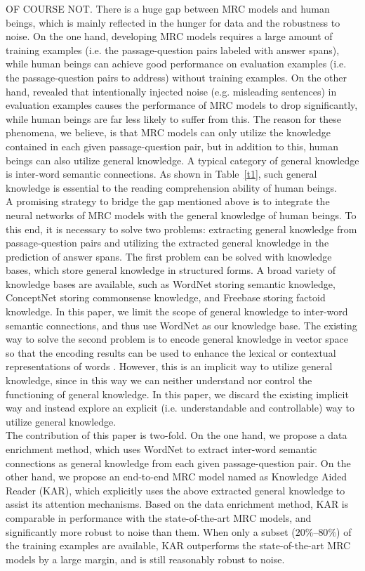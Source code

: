 \documentclass[11pt,a4paper]{article}
\begin{document}
OF COURSE NOT. There is a huge gap between MRC models and human beings, which is mainly reflected in the hunger for data and the robustness to noise. On the one hand, developing MRC models requires a large amount of training examples (i.e. the passage-question pairs labeled with answer spans), while human beings can achieve good performance on evaluation examples (i.e. the passage-question pairs to address) without training examples. On the other hand, \citet{jiarobin:2017} revealed that intentionally injected noise (e.g. misleading sentences) in evaluation examples causes the performance of MRC models to drop significantly, while human beings are far less likely to suffer from this. The reason for these phenomena, we believe, is that MRC models can only utilize the knowledge contained in each given passage-question pair, but in addition to this, human beings can also utilize general knowledge. A typical category of general knowledge is inter-word semantic connections. As shown in Table~\ref{t1}, such general knowledge is essential to the reading comprehension ability of human beings. \\
A promising strategy to bridge the gap mentioned above is to integrate the neural networks of MRC models with the general knowledge of human beings. To this end, it is necessary to solve two problems: extracting general knowledge from passage-question pairs and utilizing the extracted general knowledge in the prediction of answer spans. The first problem can be solved with knowledge bases, which store general knowledge in structured forms. A broad variety of knowledge bases are available, such as WordNet \cite{fellbaumchristiane:1998} storing semantic knowledge, ConceptNet \cite{speerrobert:2017} storing commonsense knowledge, and Freebase \cite{bollackerkurt:2008} storing factoid knowledge. In this paper, we limit the scope of general knowledge to inter-word semantic connections, and thus use WordNet as our knowledge base. The existing way to solve the second problem is to encode general knowledge in vector space so that the encoding results can be used to enhance the lexical or contextual representations of words \cite{weissenborndirk:2017, mihaylovtodor:2018}. However, this is an implicit way to utilize general knowledge, since in this way we can neither understand nor control the functioning of general knowledge. In this paper, we discard the existing implicit way and instead explore an explicit (i.e. understandable and controllable) way to utilize general knowledge. \\
The contribution of this paper is two-fold. On the one hand, we propose a data enrichment method, which uses WordNet to extract inter-word semantic connections as general knowledge from each given passage-question pair. On the other hand, we propose an end-to-end MRC model named as Knowledge Aided Reader (KAR), which explicitly uses the above extracted general knowledge to assist its attention mechanisms. Based on the data enrichment method, KAR is comparable in performance with the state-of-the-art MRC models, and significantly more robust to noise than them. When only a subset ($20\%$--$80\%$) of the training examples are available, KAR outperforms the state-of-the-art MRC models by a large margin, and is still reasonably robust to noise.
\end{document}
